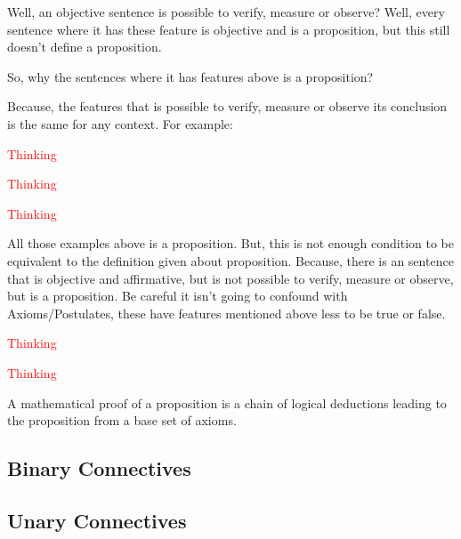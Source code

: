 Well, an objective sentence is possible to verify, measure or observe? Well, every sentence where it has these feature is objective and is a proposition, but this still doesn't define a proposition.

So, why the sentences where it has features above is a proposition?

Because, the features that is possible to verify, measure or observe its conclusion is the same for any context. For example:

\begin{example}
    \textcolor{red}{Thinking}
\end{example}

\begin{example}
    \textcolor{red}{Thinking}
\end{example}

\begin{example}
    \textcolor{red}{Thinking}
\end{example}

All those examples above is a proposition. But, this is not enough condition to be equivalent to the definition given about proposition. Because, there is an sentence that is objective and affirmative, but is not possible to verify, measure or observe, but is a proposition. Be careful it isn't going to confound with Axioms/Postulates, these have features mentioned above less to be true or false.

\begin{example}
    \textcolor{red}{Thinking}
\end{example}

\begin{example}
    \textcolor{red}{Thinking}
\end{example}

\begin{definition}
A mathematical proof of a proposition is a chain of logical deductions
leading to the proposition from a base set of axioms.

\end{definition}

\subsection{Binary Connectives}

\subsection{Unary Connectives}

\printbibliography[heading=subbibliography, title={Referências da Seção 1.1}, keyword=chapter1secao1]
